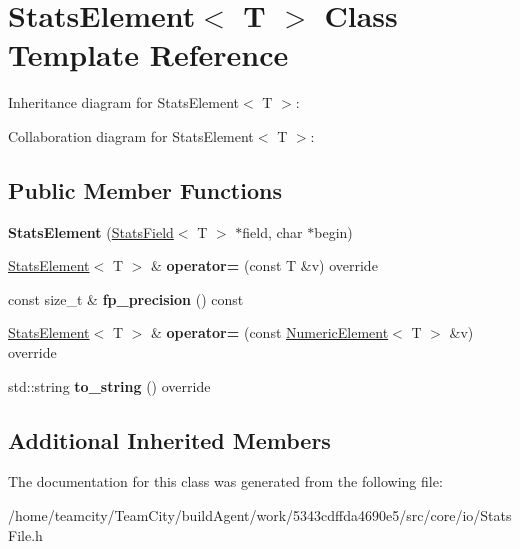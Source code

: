 \hypertarget{classStatsElement}{}\section{Stats\+Element$<$ T $>$ Class Template Reference}
\label{classStatsElement}


Inheritance diagram for Stats\+Element$<$ T $>$\+:


Collaboration diagram for Stats\+Element$<$ T $>$\+:
\subsection*{Public Member Functions}
\begin{DoxyCompactItemize}
\item 
{\bfseries Stats\+Element} (\hyperlink{classStatsField}{Stats\+Field}$<$ T $>$ $\ast$field, char $\ast$begin)\hypertarget{classStatsElement_abdaa33bb94850a172e8fe4937f6a08d0}{}\label{classStatsElement_abdaa33bb94850a172e8fe4937f6a08d0}

\item 
\hyperlink{classStatsElement}{Stats\+Element}$<$ T $>$ \& {\bfseries operator=} (const T \&v) override\hypertarget{classStatsElement_a22260166d05f40a429f23c9b006ca6de}{}\label{classStatsElement_a22260166d05f40a429f23c9b006ca6de}

\item 
const size\+\_\+t \& {\bfseries fp\+\_\+precision} () const \hypertarget{classStatsElement_a514490c4f661e5101a6a7db1128ae6e9}{}\label{classStatsElement_a514490c4f661e5101a6a7db1128ae6e9}

\item 
\hyperlink{classStatsElement}{Stats\+Element}$<$ T $>$ \& {\bfseries operator=} (const \hyperlink{classNumericElement}{Numeric\+Element}$<$ T $>$ \&v) override\hypertarget{classStatsElement_a8c01f70de8ea00a282def4e8ee299a16}{}\label{classStatsElement_a8c01f70de8ea00a282def4e8ee299a16}

\item 
std\+::string {\bfseries to\+\_\+string} () override\hypertarget{classStatsElement_a3d2493d839a018b1397b6621d0e29e3e}{}\label{classStatsElement_a3d2493d839a018b1397b6621d0e29e3e}

\end{DoxyCompactItemize}
\subsection*{Additional Inherited Members}


The documentation for this class was generated from the following file\+:\begin{DoxyCompactItemize}
\item 
/home/teamcity/\+Team\+City/build\+Agent/work/5343cdffda4690e5/src/core/io/Stats\+File.\+h\end{DoxyCompactItemize}
